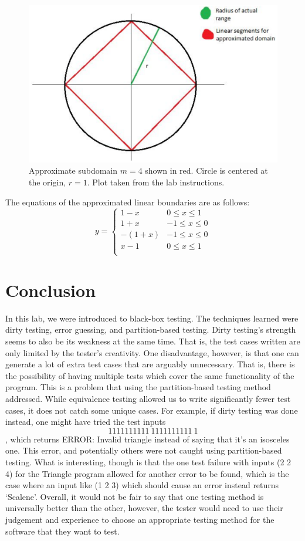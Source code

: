 \documentclass[letterpaper]{article}
\begin{document}
\begin{figure}[h]
	\centering
	\includegraphics{remotecar-subdomain.png}
	\caption{Approximate subdomain $m=4$ shown in red.
		Circle is centered at the origin, $r=1$.
	        Plot taken from the lab instructions.}
\end{figure}

The equations of the approximated linear boundaries are as follows:
	\[ y= \begin{cases} 
      1-x &  0 \leq x \leq 1 \\
      1+x &  -1 \leq x \leq 0 \\
      -(1+x) &  -1 \leq x \leq 0 \\
      x-1 &  0 \leq x \leq 1 \\
   \end{cases}
\]
\FloatBarrier
\section{Conclusion}
In this lab, we were introduced to black-box testing. The techniques
learned were dirty testing, error guessing, and partition-based testing.
Dirty testing's strength seems to also be its weakness at the same time. That is,
the test cases written are only limited by the tester's creativity.
One disadvantage, however, is that one can generate a lot of extra test cases
that are arguably unnecessary. That is, there is the possibility of having multiple
tests which cover the same functionality of the program. This is a problem that
using the partition-based testing method addressed. While equivalence testing allowed us 
to write significantly fewer test cases,
it does not catch some unique cases. For example, if dirty testing was done instead,
one might have tried the test inputs $$1111111111\ 1111111111\ 1$$, which returns ERROR: Invalid triangle
instead of saying that it's an isosceles one. This error, and potentially others were not
caught using partition-based testing. What is interesting, though is that the one
test failure with inputs (2 2 4) for the Triangle program allowed for another error to be found, which is
the case where an input like (1 2 3) which should cause an error instead returns `Scalene'.
Overall, it would not be fair to say that
one testing method is universally better than the other, however, the tester would
need to use their judgement and experience to choose an appropriate testing method
for the software that they want to test.
\end{document}
